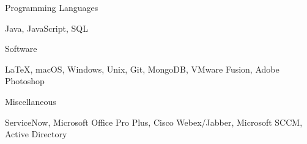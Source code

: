 \begin{cventries}
  \cventry
    {Programming Languages}
    { }
    { }
    { }
    {
      \begin{cvitems}
        \item {Java, JavaScript, SQL}
      \end{cvitems}
    }
  \cventry
    {Software}
    { }
    { }
    { }
    {
      \begin{cvitems}
        \item {LaTeX, macOS, Windows, Unix, Git, MongoDB, VMware Fusion, Adobe Photoshop}
      \end{cvitems}
    }
    \cventry
    {Miscellaneous}
    { }
    { }
    { }
    {
      \begin{cvitems}
        \item {ServiceNow, Microsoft Office Pro Plus, Cisco Webex/Jabber, Microsoft SCCM, Active Directory}
      \end{cvitems}
    }
\end{cventries}
